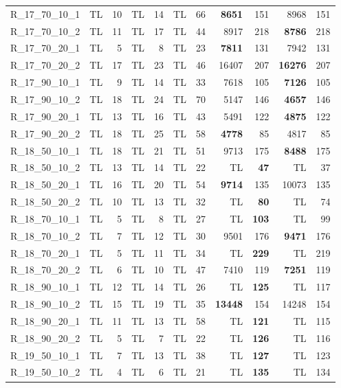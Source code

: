 \documentclass{article}
\begin{document}
\begin{longtable}{lrrrrrrrrrr}
R\_17\_70\_10\_1 & TL & 10 & TL & 14 & TL & 66 & \textbf{8651} & 151 & 8968 & 151 \\
R\_17\_70\_10\_2 & TL & 11 & TL & 17 & TL & 44 & 8917 & 218 & \textbf{8786} & 218 \\
R\_17\_70\_20\_1 & TL & 5 & TL & 8 & TL & 23 & \textbf{7811} & 131 & 7942 & 131 \\
R\_17\_70\_20\_2 & TL & 17 & TL & 23 & TL & 46 & 16407 & 207 & \textbf{16276} & 207 \\
R\_17\_90\_10\_1 & TL & 9 & TL & 14 & TL & 33 & 7618 & 105 & \textbf{7126} & 105 \\
R\_17\_90\_10\_2 & TL & 18 & TL & 24 & TL & 70 & 5147 & 146 & \textbf{4657} & 146 \\
R\_17\_90\_20\_1 & TL & 13 & TL & 16 & TL & 43 & 5491 & 122 & \textbf{4875} & 122 \\
R\_17\_90\_20\_2 & TL & 18 & TL & 25 & TL & 58 & \textbf{4778} & 85 & 4817 & 85 \\
R\_18\_50\_10\_1 & TL & 18 & TL & 21 & TL & 51 & 9713 & 175 & \textbf{8488} & 175 \\
R\_18\_50\_10\_2 & TL & 13 & TL & 14 & TL & 22 & TL & \textbf{47} & TL & 37 \\
R\_18\_50\_20\_1 & TL & 16 & TL & 20 & TL & 54 & \textbf{9714} & 135 & 10073 & 135 \\
R\_18\_50\_20\_2 & TL & 10 & TL & 13 & TL & 32 & TL & \textbf{80} & TL & 74 \\
R\_18\_70\_10\_1 & TL & 5 & TL & 8 & TL & 27 & TL & \textbf{103} & TL & 99 \\
R\_18\_70\_10\_2 & TL & 7 & TL & 12 & TL & 30 & 9501 & 176 & \textbf{9471} & 176 \\
R\_18\_70\_20\_1 & TL & 5 & TL & 11 & TL & 34 & TL & \textbf{229} & TL & 219 \\
R\_18\_70\_20\_2 & TL & 6 & TL & 10 & TL & 47 & 7410 & 119 & \textbf{7251} & 119 \\
R\_18\_90\_10\_1 & TL & 12 & TL & 14 & TL & 26 & TL & \textbf{125} & TL & 117 \\
R\_18\_90\_10\_2 & TL & 15 & TL & 19 & TL & 35 & \textbf{13448} & 154 & 14248 & 154 \\
R\_18\_90\_20\_1 & TL & 11 & TL & 13 & TL & 58 & TL & \textbf{121} & TL & 115 \\
R\_18\_90\_20\_2 & TL & 5 & TL & 7 & TL & 22 & TL & \textbf{126} & TL & 116 \\
R\_19\_50\_10\_1 & TL & 7 & TL & 13 & TL & 38 & TL & \textbf{127} & TL & 123 \\
R\_19\_50\_10\_2 & TL & 4 & TL & 6 & TL & 21 & TL & \textbf{135} & TL & 134 \\

\end{longtable}
\end{document}
